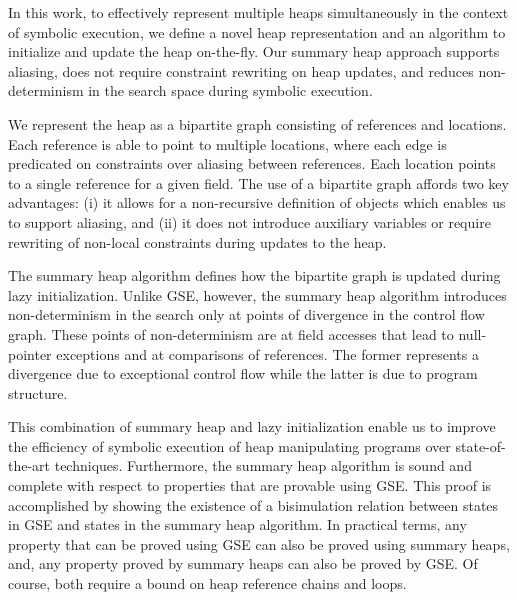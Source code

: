 
In this work, to effectively represent multiple heaps simultaneously
in the context of symbolic execution, we define a novel heap
representation and an algorithm to initialize and update the heap
on-the-fly. Our summary heap approach supports aliasing, does not
require constraint rewriting on heap updates, and reduces
non-determinism in the search space during symbolic execution.

We represent the heap as a bipartite graph consisting of references
and locations. Each reference is able to point to multiple locations,
where each edge is predicated on constraints over aliasing between
references. Each location points to a single reference for a given
field. The use of a bipartite graph affords two key advantages: (i)
it allows for a non-recursive definition of objects which enables us
to support aliasing, and (ii) it does not introduce auxiliary variables or 
require rewriting of non-local constraints during updates to the heap.

The summary heap algorithm defines how the bipartite graph is updated
during lazy initialization. Unlike GSE, however, the summary heap
algorithm introduces non-determinism in the search only at points of
divergence in the control flow graph. These points of non-determinism
are at field accesses that lead to null-pointer exceptions
and at comparisons of references. The former represents a divergence
due to exceptional control flow while the latter is due to program
structure. 


This combination of summary heap and lazy initialization
enable us to improve the efficiency of symbolic execution of heap
manipulating programs over state-of-the-art techniques.
Furthermore, the summary heap algorithm is sound and complete with
respect to properties that are provable using GSE. This proof is
accomplished by showing the existence of a bisimulation relation
between states in GSE and states in the summary heap algorithm. In
practical terms, any property that can be proved using GSE can also be
proved using summary heaps, and, any property proved by
summary heaps can also be proved by GSE. Of course, both require a
bound on heap reference chains and loops.

